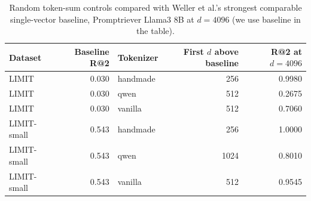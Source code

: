 \begin{table}[H]
  \centering
  \small
  \caption{Random token-sum controls compared with Weller et al.'s
  strongest comparable single-vector baseline, Promptriever Llama3 8B
  at $d=4096$ (we use baseline in the table).}
  \label{tab:limit-promptriever-crossing}
  \begin{tabular}{lrlrr}
    \toprule
    Dataset & Baseline R@2 & Tokenizer & First $d$ above baseline & R@2 at $d=4096$ \\
    \midrule
    LIMIT & 0.030 & handmade & 256 & 0.9980 \\
    LIMIT & 0.030 & qwen & 512 & 0.2675 \\
    LIMIT & 0.030 & vanilla & 512 & 0.7060 \\
    LIMIT-small & 0.543 & handmade & 256 & 1.0000 \\
    LIMIT-small & 0.543 & qwen & 1024 & 0.8010 \\
    LIMIT-small & 0.543 & vanilla & 512 & 0.9545 \\
    \bottomrule
  \end{tabular}
\end{table}
